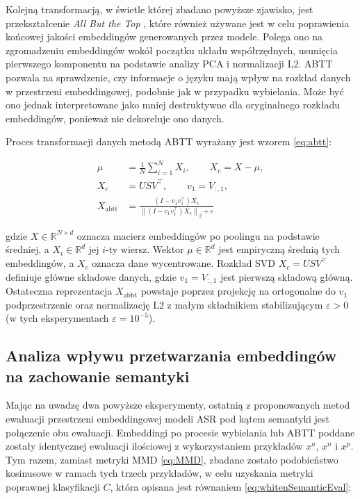 Kolejną transformacją, w świetle której zbadano powyższe zjawisko, jest przekształcenie \textit{All But the Top} \cite{abtt}, które również używane jest w celu poprawienia końcowej jakości embeddingów generowanych przez modele. Polega ono na zgromadzeniu embeddingów wokół początku układu współrzędnych, usunięcia pierwszego komponentu na podstawie analizy PCA i normalizacji L2. ABTT pozwala na sprawdzenie, czy informacje o języku mają wpływ na rozkład danych w przestrzeni embeddingowej, podobnie jak w przypadku wybielania. Może być ono jednak interpretowane jako mniej destruktywne dla oryginalnego rozkładu embeddingów, ponieważ nie dekoreluje ono danych.

Proces transformacji danych metodą ABTT wyrażany jest wzorem \eqref{eq:abtt}:

\begin{equation}
\label{eq:abtt}
\begin{aligned}
\mu &= \frac{1}{N}\sum_{i=1}^{N} X_i, \qquad
X_c = X - \mu, \\
X_c &= U S V^\top, \qquad
v_1 = V_{:,1}, \\
X_{\mathrm{abtt}} &=
\frac{\left(I - v_1 v_1^\top\right) X_c}
{\left\|\left(I - v_1 v_1^\top\right) X_c\right\|_2 + \varepsilon}
\end{aligned}
\end{equation}

gdzie $X \in \mathbb{R}^{N \times d}$ oznacza macierz embeddingów po poolingu na podstawie średniej, a $X_i \in \mathbb{R}^{d}$ jej $i$-ty wiersz. Wektor $\mu \in \mathbb{R}^{d}$ jest empiryczną średnią tych embeddingów, a $X_c$ oznacza dane wycentrowane. Rozkład SVD $X_c = U S V^\top$ definiuje główne składowe danych, gdzie $v_1 = V_{:,1}$ jest pierwszą składową główną. Ostateczna reprezentacja $X_{\mathrm{abbt}}$ powstaje poprzez projekcję na ortogonalne do $v_1$ podprzestrzenie oraz normalizację L2 z małym składnikiem stabilizującym $\varepsilon > 0$ (w tych eksperymentach $\varepsilon = 10^{-5}$).

\subsection{Analiza wpływu przetwarzania embeddingów na zachowanie semantyki}
Mając na uwadzę dwa powyższe eksperymenty, ostatnią z proponowanych metod ewaluacji przestrzeni embeddingowej modeli ASR pod kątem semantyki jest połączenie obu ewaluacji. Embeddingi po procesie wybielania lub ABTT poddane zostały identycznej ewaluacji ilościowej z wykorzystaniem przykładów $x^a$, $x^n$ i $x^p$. Tym razem, zamiast metryki MMD \ref{eq:MMD}, zbadane zostało podobieństwo kosinusowe w ramach tych trzech przykładów, w celu uzyskania metryki poprawnej klasyfikacji $C$, która opisana jest równaniem \eqref{eq:whitenSemanticEval}:

